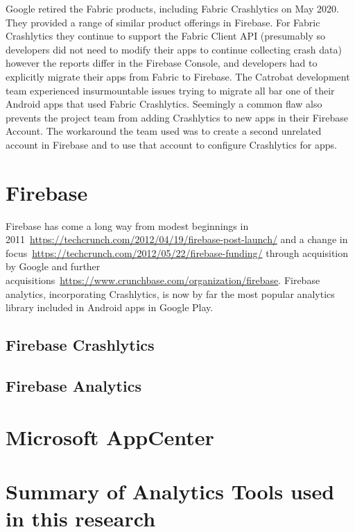 Google retired the Fabric products, including Fabric Crashlytics on  May 2020. They provided a range of similar product offerings in Firebase. For Fabric Crashlytics they continue to support the Fabric Client API (presumably so developers did not need to modify their apps to continue collecting crash data) however the reports differ in the Firebase Console, and developers had to explicitly migrate their apps from Fabric to Firebase. The Catrobat development team experienced insurmountable issues trying to migrate all bar one of their Android apps that used Fabric Crashlytics. Seemingly a common flaw also prevents the project team from adding Crashlytics to new apps in their Firebase Account. The workaround the team used was to create a second unrelated account in Firebase and to use that account to configure Crashlytics for apps. %

\section{Firebase}
Firebase has come a long way from modest beginnings in 2011~\url{https://techcrunch.com/2012/04/19/firebase-post-launch/} and a change in focus~\url{https://techcrunch.com/2012/05/22/firebase-funding/} through acquisition by Google and further acquisitions~\url{https://www.crunchbase.com/organization/firebase}. Firebase analytics, incorporating Crashlytics, is now by far the most popular analytics library included in Android apps in Google Play. 

\subsection{Firebase Crashlytics}

\subsection{Firebase Analytics}

\section{Microsoft AppCenter}

\section{Summary of Analytics Tools used in this research}
